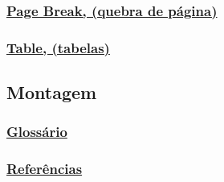 \subsubsection{\underline{Page Break, (quebra de página)}}

\subsubsection{\underline{Table, (tabelas)}}

\subsection{Montagem}

\subsubsection{\underline{Glossário}}

\subsubsection{\underline{Referências}}